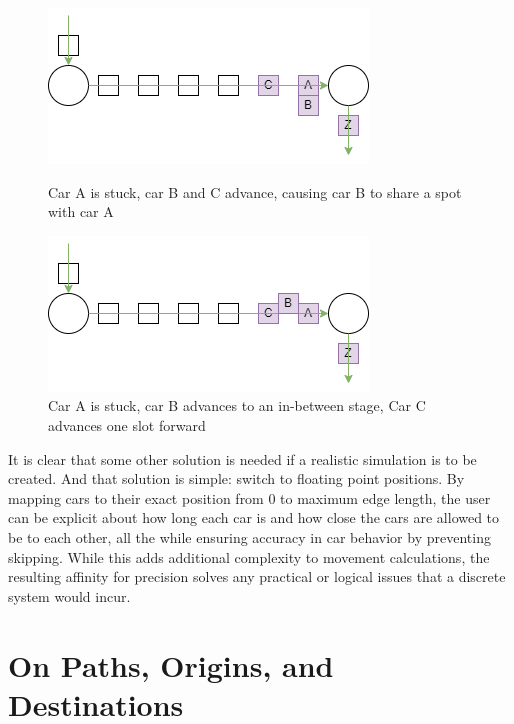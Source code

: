 \begin{figure}[H]
    \centering
	\includegraphics[width=0.75\linewidth]{tex files/Figures/BasicDiscrete_Overlap.png}
	\caption[Discrete positions: multiple cars at one location]{Car A is stuck, car B and C advance, causing car B to share a spot with car A}
	\label{fig:BasicDiscrete_overlap}
	
	\includegraphics[width=0.75\linewidth]{tex files/Figures/BasicDiscrete_between.png}
	\caption[Discrete positions: non-fixed locations]{Car A is stuck, car B advances to an in-between stage, Car C advances one slot forward}
	\label{fig:BasicDiscrete_between}
\end{figure}

\par It is clear that some other solution is needed if a realistic simulation is to be created.  And that solution is simple:  switch to floating point positions.  By mapping cars to their exact position from 0 to maximum edge length, the user can be explicit about how long each car is and how close the cars are allowed to be to each other, all the while ensuring accuracy in car behavior by preventing skipping.  While this adds additional complexity to movement calculations, the resulting affinity for precision solves any practical or logical issues that a discrete system would incur.


\section{On Paths, Origins, and Destinations}

